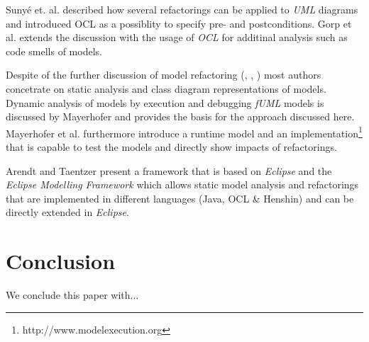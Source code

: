 \documentclass{llncs}
\begin{document}

Suny{\'e} et. al. \cite{DBLP:conf/uml/SunyePTJ01} described how several refactorings can be applied to \textit{UML}
diagrams and introduced OCL as a possiblity to specify pre- and postconditions. Gorp et al. \cite{gorp03} extends the
discussion with the usage of \textit{OCL} for additinal analysis such as code smells of models.


Despite of the further discussion of model refactoring (\cite{DBLP:conf/uml/CorreaW04}, \cite{DBLP:conf/ershov/BaarM06},
\cite{DBLP:journals/ase/ArendtT13}) most authors concetrate on static analysis and class diagram representations of
models. Dynamic analysis of models by execution and debugging \textit{fUML} models is discussed by Mayerhofer
\cite{DBLP:conf/icse/Mayerhofer12} and provides the basis for the approach discussed here. Mayerhofer et al.
\cite{DBLP:conf/models/MayerhoferLK12} furthermore introduce a runtime model and an
implementation\footnote{http://www.modelexecution.org} that is capable to test the models and directly show impacts of
refactorings.


Arendt and Taentzer \cite{DBLP:journals/ase/ArendtT13} present a framework that is based on \textit{Eclipse} and the
\textit{Eclipse Modelling Framework} which allows static model analysis and refactorings that are implemented in
different languages (Java, OCL \& Henshin) and can be directly extended in \textit{Eclipse}.


\section{Conclusion}
\label{sec:conclusion}
We conclude this paper with...

\newpage


\end{document}
